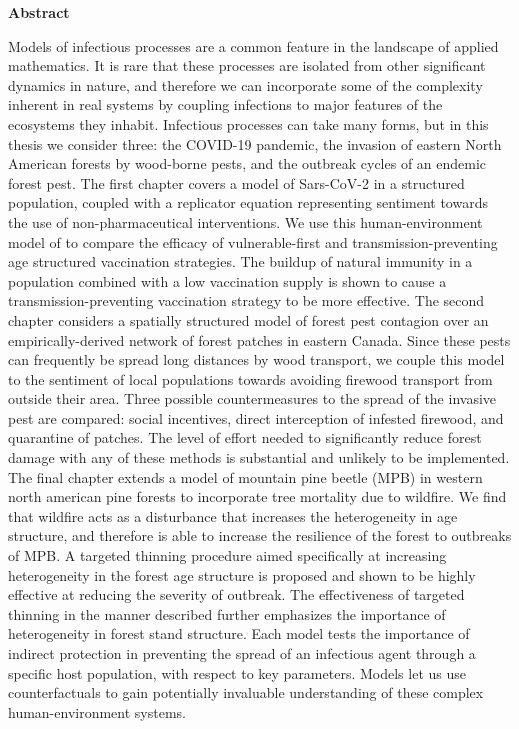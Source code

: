 
\begin{center}\textbf{Abstract}\end{center}


Models of infectious processes are a common feature in the landscape of applied mathematics. It is rare that these processes are isolated from other significant dynamics in nature, and therefore we can incorporate some of the complexity inherent in real systems by coupling infections to major features of the ecosystems they inhabit. Infectious processes can take many forms, but in this thesis we consider three: the COVID-19 pandemic, the invasion of eastern North American forests by wood-borne pests, and the outbreak cycles of an endemic forest pest. The first chapter covers a model of Sars-CoV-2 in a structured population, coupled with a replicator equation representing sentiment towards the use of non-pharmaceutical interventions. We use this human-environment model of to compare the efficacy of vulnerable-first and transmission-preventing age structured vaccination strategies. The buildup of natural immunity in a population combined with a low vaccination supply is shown to cause a transmission-preventing vaccination strategy to be more effective. The second chapter considers a spatially structured model of forest pest contagion over an empirically-derived network of forest patches in eastern Canada. Since these pests can frequently be spread long distances by wood transport, we couple this model to the sentiment of local populations towards avoiding firewood transport from outside their area. Three possible countermeasures to the spread of the invasive pest are compared: social incentives, direct interception of infested firewood, and quarantine of patches. The level of effort needed to significantly reduce forest damage with any of these methods is substantial and unlikely to be implemented. The final chapter extends a model of mountain pine beetle (MPB) in western north american pine forests to incorporate tree mortality due to wildfire. We find that wildfire acts as a disturbance that increases the heterogeneity in age structure, and therefore is able to increase the resilience of the forest to outbreaks of MPB. A targeted thinning procedure aimed specifically at increasing heterogeneity in the forest age structure is proposed and shown to be highly effective at reducing the severity of outbreak. The effectiveness of targeted thinning in the manner described further emphasizes the importance of heterogeneity in forest stand structure. Each model tests the importance of indirect protection in preventing the spread of an infectious agent through a specific host population, with respect to key parameters. Models let us use counterfactuals to gain potentially invaluable understanding of these complex human-environment systems.



